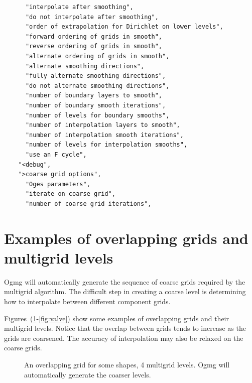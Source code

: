 \documentclass{article}
\begin{document}
\begin{verbatim}
      "interpolate after smoothing",
      "do not interpolate after smoothing",
      "order of extrapolation for Dirichlet on lower levels",
      "forward ordering of grids in smooth",
      "reverse ordering of grids in smooth",
      "alternate ordering of grids in smooth",
      "alternate smoothing directions",
      "fully alternate smoothing directions",
      "do not alternate smoothing directions",
      "number of boundary layers to smooth",
      "number of boundary smooth iterations",
      "number of levels for boundary smooths",
      "number of interpolation layers to smooth",
      "number of interpolation smooth iterations",
      "number of levels for interpolation smooths",
      "use an F cycle",
    "<debug",
    ">coarse grid options",
      "Oges parameters",
      "iterate on coarse grid",
      "number of coarse grid iterations",

\end{verbatim}


\clearpage
\section{Examples of overlapping grids and multigrid levels}

Ogmg will automatically generate the sequence of coarse grids required by the multigrid
algorithm. The difficult step in creating a coarse level is determining how to interpolate
between different component grids. 

Figures~(\ref{fig:shapes}-\ref{fig:valve}) show some examples of overlapping grids and their multigrid levels.
Notice that the overlap between grids tends to increase as the grids are coarsened. 
The accuracy of interpolation may also be relaxed on the coarse grids. 

{
\newcommand{\figWidth}{7.cm}
\newcommand{\trimfig}[2]{\trimPlotb{#1}{#2}{.0}{.0}{.10}{.10}}
\begin{figure}[hbt]
\begin{center}
\end{center}
\caption{An overlapping grid for some shapes, 4 multigrid levels. Ogmg will automatically generate
the coarser levels.} \label{fig:shapes}
\end{figure}
}
\end{document}
